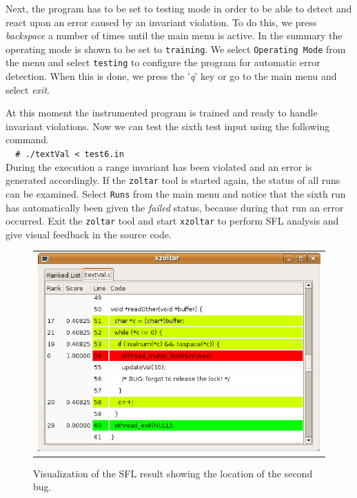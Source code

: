 	Next, the program has to be set to testing mode in order to be able to detect and react upon an 
	error caused by an invariant violation.
	To do this, we press \emph{backspace} a number of times until the main menu is active.
	In the summary the operating mode is shown to be set to \verb|training|.
	We select \verb|Operating Mode| from the menu and select \verb|testing| to configure the program
	for automatic error detection.
	When this is done, we press the '\emph{q}' key or go to the main menu and select \emph{exit}.
	
	At this moment the instrumented program is trained and ready to handle invariant violations.
	Now we can test the sixth test input using the following command.\\
	\verb|  # ./textVal < test6.in|\\
	During the execution a range invariant has been violated and an error is generated accordingly.
	If the \verb|zoltar| tool is started again, the status of all runs can be examined.
	Select \verb|Runs| from the main menu and notice that the sixth run has automatically been 
	given the \emph{failed} status, because during that run an error occurred.
	Exit the \verb|zoltar| tool and start \verb|xzoltar| to perform SFL analysis
	and give visual feedback in the source code.
	
	\begin{figure}[h!]
		\begin{center}
		\begin{tabular}{c}
			\includegraphics[scale=0.40]{sources/ganalyze_bug2.png} \\
		\end{tabular}
		\end{center}
		\caption{Visualization of the SFL result showing the location of the second bug.}
		\label{fig:ganalyzeBug2}
	\end{figure}

